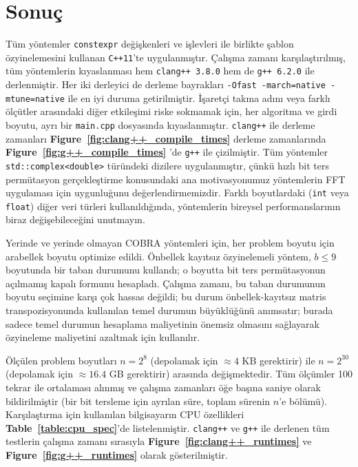 \documentclass[10pt]{article}
\begin{document}
\section*{Sonu\c{c}}
T\"{u}m y\"{o}ntemler {\tt constexpr} de\u{g}i\c{s}kenleri ve i\c{s}levleri ile birlikte
\c{s}ablon \"{o}zyinelemesini kullanan {\tt C++11}'te uygulanm{\i}\c{s}t{\i}r. 
\c{C}al{\i}\c{s}ma zaman{\i} kar\c{s}{\i}la\c{s}t{\i}r{\i}lm{\i}\c{s}, t\"{u}m y\"{o}ntemlerin k{\i}yaslanmas{\i} 
hem {\tt clang++ 3.8.0} hem de {\tt g++ 6.2.0} ile derlenmi\c{s}tir. 
Her iki derleyici de derleme bayraklar{\i} {\tt -Ofast   -march=native -mtune=native} 
ile en iyi duruma getirilmi\c{s}tir. \.{I}\c{s}aret\c{c}i takma ad{\i}n{\i} veya farkl{\i} 
\"{o}l\c{c}\"{u}tler aras{\i}ndaki di\u{g}er etkile\c{s}imi riske sokmamak i\c{c}in, her algoritma 
ve girdi boyutu, ayr{\i} bir {\tt main.cpp} dosyas{\i}nda k{\i}yaslanm{\i}\c{s}t{\i}r. 
{\tt clang++} ile derleme zamanlar{\i} {\bf   Figure~\ref{fig:clang++_compile_times}} 
derleme zamanlar{\i}nda {\bf Figure~\ref{fig:g++_compile_times}} 'de {\tt g++} ile 
\c{c}izilmi\c{s}tir. T\"{u}m y\"{o}ntemler {\tt std::complex<double>} t\"{u}r\"{u}ndeki dizilere uygulanm{\i}\c{s}t{\i}r, 
\c{c}\"{u}nk\"{u} h{\i}zl{\i} bit ters perm\"{u}tasyon ger\c{c}ekle\c{s}tirme konusundaki ana motivasyonumuz 
y\"{o}ntemlerin FFT uygulamas{\i} i\c{c}in uygunlu\u{g}unu de\u{g}erlendirmemizdir. 
Farkl{\i} boyutlardaki ({\tt int} veya {\tt float}) di\u{g}er veri t\"{u}rleri 
kullan{\i}ld{\i}\u{g}{\i}nda, y\"{o}ntemlerin bireysel performanslar{\i}n{\i}n biraz 
de\u{g}i\c{s}ebilece\u{g}ini unutmay{\i}n.

Yerinde ve yerinde olmayan COBRA y\"{o}ntemleri i\c{c}in, her problem boyutu 
i\c{c}in arabellek boyutu optimize edildi. \"{O}nbellek kay{\i}ts{\i}z \"{o}zyinelemeli 
y\"{o}ntem, $b \leq 9$ boyutunda bir taban durumunu kulland{\i}; o boyutta 
bit ters perm\"{u}tasyonun a\c{c}{\i}lmam{\i}\c{s} kapal{\i} formunu hesaplad{\i}. \c{C}al{\i}\c{s}ma zaman{\i}, 
bu taban durumunun boyutu se\c{c}imine kar\c{s}{\i} \c{c}ok hassas de\u{g}ildi; 
bu durum \"{o}nbellek-kay{\i}ts{\i}z matris transpozisyonunda kullan{\i}lan temel durumun 
b\"{u}y\"{u}kl\"{u}\u{g}\"{u}n\"{u} an{\i}msat{\i}r; burada sadece temel durumun hesaplama 
maliyetinin \"{o}nemsiz olmas{\i}n{\i} sa\u{g}layarak \"{o}zyineleme maliyetini 
azaltmak i\c{c}in kullan{\i}l{\i}r.

\"{O}l\c{c}\"{u}len problem boyutlar{\i} $n = 2^8$ (depolamak i\c{c}in $\approx 4$ KB gerektirir) 
ile $n = 2^{30}$ (depolamak i\c{c}in $\approx 16.4$ GB gerektirir) aras{\i}nda 
de\u{g}i\c{s}mektedir. T\"{u}m \"{o}l\c{c}\"{u}mler 100 tekrar ile ortalamas{\i} al{\i}nm{\i}\c{s} ve 
\c{c}al{\i}\c{s}ma zamanlar{\i} \"{o}\u{g}e ba\c{s}{\i}na saniye olarak bildirilmi\c{s}tir (bir bit tersleme 
i\c{c}in ayr{\i}lan s\"{u}re, toplam s\"{u}renin $n$'e b\"{o}l\"{u}m\"{u}). Kar\c{s}{\i}la\c{s}t{\i}rma i\c{c}in 
kullan{\i}lan bilgisayar{\i}n CPU \"{o}zellikleri {\bf Table~\ref{table:cpu_spec}}'de 
listelenmi\c{s}tir. {\tt clang++} ve {\tt g++} ile derlenen t\"{u}m testlerin 
\c{c}al{\i}\c{s}ma zaman{\i} s{\i}ras{\i}yla {\bf Figure~\ref{fig:clang++_runtimes}} ve 
{\bf Figure~\ref{fig:g++_runtimes}} olarak g\"{o}sterilmi\c{s}tir.
\end{document}
